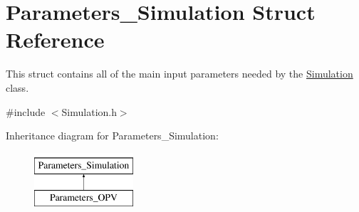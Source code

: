 \hypertarget{struct_parameters___simulation}{}\section{Parameters\+\_\+\+Simulation Struct Reference}
\label{struct_parameters___simulation}


This struct contains all of the main input parameters needed by the \hyperlink{class_simulation}{Simulation} class.  




{\ttfamily \#include $<$Simulation.\+h$>$}

Inheritance diagram for Parameters\+\_\+\+Simulation\+:\begin{figure}[H]
\begin{center}
\leavevmode
\includegraphics[height=2.000000cm]{struct_parameters___simulation}
\end{center}
\end{figure}
